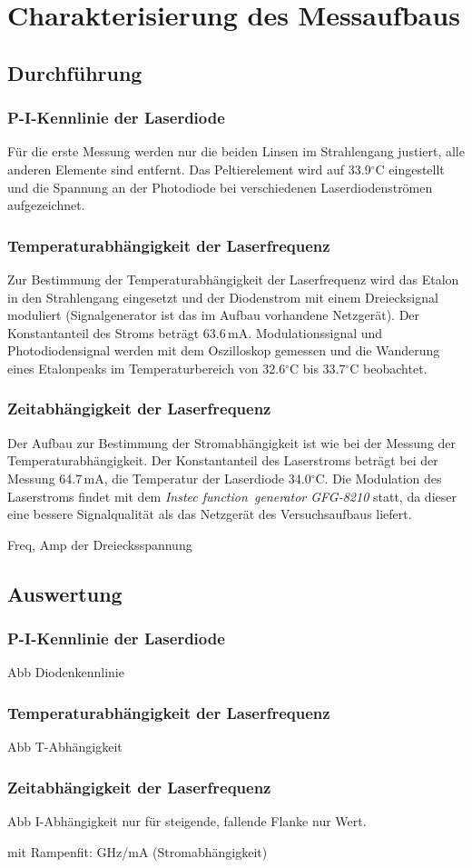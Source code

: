 \section{Charakterisierung des Messaufbaus}
\subsection{Durchführung}
\subsubsection*{P-I-Kennlinie der Laserdiode}
Für die erste Messung werden nur die beiden Linsen im Strahlengang justiert, alle anderen Elemente sind entfernt. 
Das Peltierelement wird auf 33.9$^\circ$C eingestellt und die Spannung an der
Photodiode bei verschiedenen Laserdiodenströmen aufgezeichnet.

\subsubsection*{Temperaturabhängigkeit der Laserfrequenz}
Zur Bestimmung der Temperaturabhängigkeit der
Laserfrequenz wird das Etalon in den Strahlengang eingesetzt und der Diodenstrom mit einem Dreiecksignal moduliert
(Signalgenerator ist das im Aufbau vorhandene Netzgerät).
Der Konstantanteil des Stroms beträgt 63.6\,mA.
Modulationssignal und Photodiodensignal werden mit dem Oszilloskop gemessen und die Wanderung eines Etalonpeaks
im Temperaturbereich von 32.6$^\circ$C bis 33.7$^\circ$C beobachtet.

\subsubsection*{Zeitabhängigkeit der Laserfrequenz}
Der Aufbau zur Bestimmung der Stromabhängigkeit ist
wie bei der Messung der Temperaturabhängigkeit.
Der Konstantanteil des Laserstroms beträgt bei der Messung 64.7\,mA,
die Temperatur der Laserdiode 34.0$^\circ$C.
Die Modulation des Laserstroms findet mit dem \emph{Instec function~generator GFG-8210} statt,
da dieser eine bessere Signalqualität als das Netzgerät des Versuchsaufbaus liefert.

Freq, Amp der Dreiecksspannung

\subsection{Auswertung}
\subsubsection*{P-I-Kennlinie der Laserdiode}
Abb Diodenkennlinie

\subsubsection*{Temperaturabhängigkeit der Laserfrequenz}
Abb T-Abhängigkeit

\subsubsection*{Zeitabhängigkeit der Laserfrequenz} 

Abb I-Abhängigkeit nur für steigende,
fallende Flanke nur Wert.

mit Rampenfit: GHz/mA (Stromabhängigkeit)